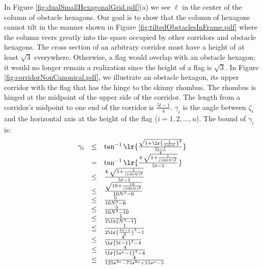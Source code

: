 In Figure \ref{fig:dualSmallHexagonalGrid.pdf}(a) we see $\ell$ in the center of the column of obstacle hexagons.  
Our goal is to show that the column of hexagons cannot tilt in the manner shown in Figure \ref{fig:tiltedObstaclesInFrame.pdf} where the column veers greatly into the space occupied by other corridors and obstacle hexagons.
The cross section of an arbitrary corridor must have a height of at least $\sqrt{3}$ everywhere. 
Otherwise, a flag would overlap with an obstacle hexagon; it would no longer remain a realization since the height of a flag is $\sqrt{3}$.
In Figure \ref{fig:corridorNonCanonical.pdf}, we illustrate an obstacle hexagon, its upper corridor with the flag that has the hinge to the skinny rhombus.  
The rhombus is hinged at the midpoint of the upper side of the corridor.
The length from a corridor's midpoint to one end of the corridor is $\frac{5t-1}{4}$.
$\gamma_i$ is the angle between $\zeta_i$ and the horizontal axis at the height of the flag ($i = 1,2,\ldots, u$).
The bound of $\gamma_i$ is:
\begin{equation}\label{eqn:gammaBound}
\begin{array}{rcl}
\gamma_i &\leq & \tan^{-1} \lr{
								\frac{
										\sqrt{1+ \lr{	\frac{1}{100N}	}^2}
								}{
										\frac{5t-1}{4}
								}	
							}\\
&=& \tan^{-1} \lr{\frac{4\cdot \sqrt{1 + \frac{1}{(100N)^2}}}{5t-1}}\\
&\leq& \frac{4\cdot \sqrt{1 + \frac{1}{(100N)^2}}}{5t-1}\\
&\leq& \frac{\sqrt{16 + \frac{16}{(100N)^2}}}{10N^3 -6}\\
&\leq& \frac{5}{10N^3 -6}\\
&\leq& \frac{5}{10N^3 - 10}\\
&\leq& \frac{1}{2\lr{N^3 - 1}}\\
&\leq& \frac{1}{2 \lr{\frac{5t-1}{2}}^3 - 1}\\
&\leq& \frac{4}{\lr{5t-1}^3-4}\\
&\leq& \frac{4}{\lr{5s^\kappa-1}^3-4}\\
&\leq& \frac{4}{125 s^{3\kappa}-75 s^{2\kappa}+15 s^\kappa-5}
\end{array} 
\end{equation}
